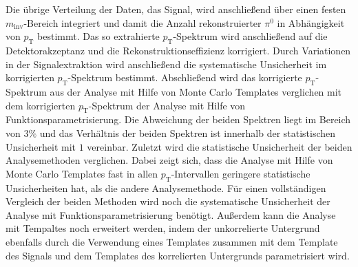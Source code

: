 Die übrige Verteilung der Daten, das Signal, wird anschließend über einen festen $m_\text{inv}$-Bereich integriert und damit die Anzahl rekonstruierter $\pi^{0}$ in Abhängigkeit von $p_\text{T}$ bestimmt.
\newline
Das so extrahierte $p_\text{T}$-Spektrum wird anschließend auf die Detektorakzeptanz und die Rekonstruktionseffizienz korrigiert.
Durch Variationen in der Signalextraktion wird anschließend die systematische Unsicherheit im korrigierten $p_\text{T}$-Spektrum bestimmt.
\newline
Abschließend wird das korrigierte $p_\text{T}$-Spektrum aus der Analyse mit Hilfe von Monte Carlo Templates verglichen mit dem korrigierten $p_\text{T}$-Spektrum der Analyse mit Hilfe von Funk\-ti\-ons\-pa\-ra\-me\-tri\-sie\-rung.
Die Abweichung der beiden Spektren liegt im Bereich von $3\%$ und das Verhältnis der beiden Spektren ist innerhalb der statistischen Unsicherheit mit $1$ vereinbar.
Zuletzt wird die statistische Unsicherheit der beiden Analysemethoden verglichen.
Dabei zeigt sich, dass die Analyse mit Hilfe von Monte Carlo Templates fast in allen $p_\text{T}$-Intervallen geringere statistische Unsicherheiten hat, als die andere Analysemethode.
\newline
Für einen vollständigen Vergleich der beiden Methoden wird noch die systematische Unsicherheit der Analyse mit Funktionsparametrisierung benötigt.
Außerdem kann die Analyse mit Tempaltes noch erweitert werden, indem der unkorrelierte Untergrund ebenfalls durch die Verwendung eines Templates zusammen mit dem Template des Signals und dem Templates des korrelierten Untergrunds parametrisiert wird.